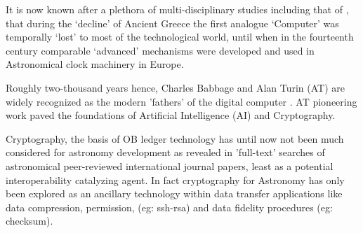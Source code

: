 \documentclass[final,5p,times,twocolumn,authoryear]{elsarticle}
\begin{document}
 It is now known after a plethora of multi-disciplinary studies including that of \citet{Freeth2021}, that during the `decline' of Ancient Greece the first analogue `Computer' was temporally `lost' to most of the technological world, until when in the fourteenth century comparable `advanced' mechanisms were developed and used in Astronomical clock machinery in Europe. 
 
 Roughly two-thousand years hence, Charles Babbage and Alan Turin (AT) are widely recognized as the modern 'fathers' of the digital computer \citep{swa2017}. AT pioneering  work paved the foundations of Artificial Intelligence (AI) and Cryptography. 
 
Cryptography, the basis of OB ledger technology has until now not been much considered for astronomy development as revealed in 'full-text' searches of astronomical peer-reviewed international journal papers, least as a potential interoperability catalyzing agent. In fact cryptography for Astronomy has only been explored as an ancillary technology within data transfer applications like data compression, permission, (eg: ssh-rsa) and data fidelity procedures (eg: checksum).
\end{document}
